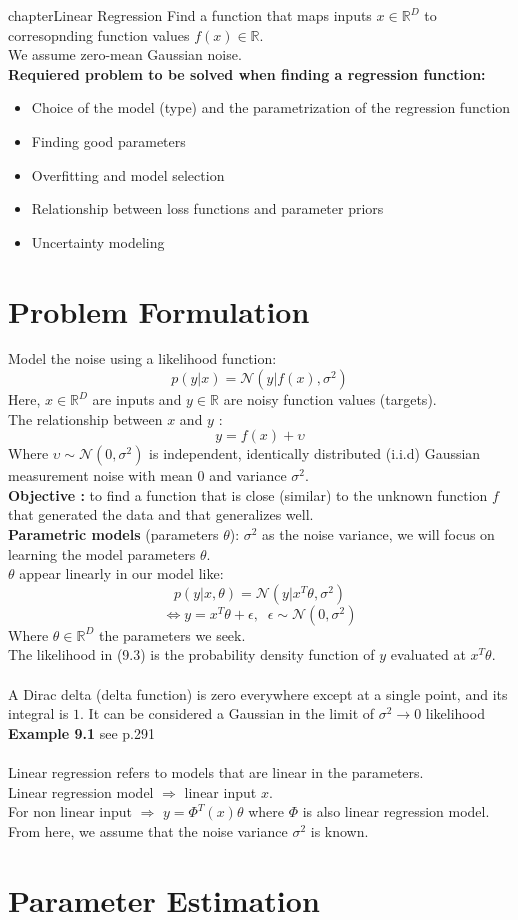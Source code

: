 chapter{Linear Regression}
Find a function that maps inputs $x \in \mathbb{R}^D$ to corresopnding function values $f(x) \in \mathbb{R}$. \\ 
We assume zero-mean Gaussian noise.\\
\textbf{Requiered problem to be solved when finding a regression function:}
\begin{itemize}
	\item Choice of the model (type) and the parametrization of the regression function
	\item Finding good parameters
	\item Overfitting and model selection
	\item Relationship between loss functions and parameter priors
	\item Uncertainty modeling
\end{itemize}

\section{Problem Formulation}
Model the noise using a likelihood function:
\[
p(y|x) = \mathcal{N}(y|f(x), \sigma^2) \tag{9.1}
\]
Here, $x \in \mathbb{R}^D$ are inputs and $y \in \mathbb{R}$ are noisy function values (targets). \\
The relationship between $x$ and $y$ :
\[
y = f(x) + \upsilon \tag{9.2} 
\]
Where $\upsilon \sim \mathcal{N}(0, \sigma^2)$ is independent, identically distributed (i.i.d)  Gaussian measurement noise with mean 0 and variance $\sigma^2$.\\
\textbf{Objective :} to find a function that is close (similar) to the unknown function $f$ that generated the data and that generalizes well. \\
\textbf{Parametric models} (parameters $\theta$): $\sigma^2$ as the noise variance, we will focus on learning the model parameters $\theta$.\\
$\theta$ appear linearly in our model like:
\[
p(y|x, \theta) = \mathcal{N}(y|x^T  \theta, \sigma^2) \tag{9.3}
\]
\[
\Leftrightarrow y = x^T \theta + \epsilon, \; \; \epsilon \sim \mathcal{N} (0, \sigma^2) \tag{9.4}
\]
Where $\theta \in \mathbb{R}^D$ the parameters we seek.\\
The likelihood in (9.3) is the probability density function of $y$ evaluated at $x^{T} \theta$.\\ \\ 
A Dirac delta (delta function) is zero everywhere except at a single point, and its integral is $1$. It can be considered a Gaussian in the limit of $\sigma^2 \rightarrow 0$ likelihood
\textbf{Example 9.1} see p.291\\ \\
Linear regression refers to models that are linear in the parameters. \\
Linear regression model $\Rightarrow$ linear input $x$.\\
For non linear input $\Rightarrow$ $y = \Phi^{T}(x) \theta$ where $\Phi$ is also linear regression model.\\
From here, we assume that the noise variance $\sigma^2$ is known.

\section{Parameter Estimation}